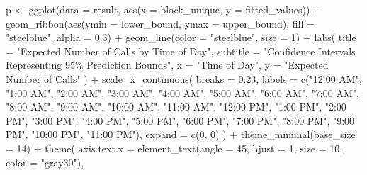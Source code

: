 \documentclass[
  letterpaper,
  DIV=11,
  numbers=noendperiod]{scrartcl}
\newenvironment{Shaded}{\begin{snugshade}}{\end{snugshade}}
\newcommand{\AttributeTok}[1]{\textcolor[rgb]{0.40,0.45,0.13}{#1}}
\newcommand{\DecValTok}[1]{\textcolor[rgb]{0.68,0.00,0.00}{#1}}
\newcommand{\FloatTok}[1]{\textcolor[rgb]{0.68,0.00,0.00}{#1}}
\newcommand{\FunctionTok}[1]{\textcolor[rgb]{0.28,0.35,0.67}{#1}}
\newcommand{\NormalTok}[1]{\textcolor[rgb]{0.00,0.23,0.31}{#1}}
\newcommand{\OtherTok}[1]{\textcolor[rgb]{0.00,0.23,0.31}{#1}}
\newcommand{\SpecialCharTok}[1]{\textcolor[rgb]{0.37,0.37,0.37}{#1}}
\newcommand{\StringTok}[1]{\textcolor[rgb]{0.13,0.47,0.30}{#1}}
\begin{document}
\begin{Shaded}
\begin{Highlighting}[]
\NormalTok{p }\OtherTok{\textless{}{-}} \FunctionTok{ggplot}\NormalTok{(}\AttributeTok{data =}\NormalTok{ result, }\FunctionTok{aes}\NormalTok{(}\AttributeTok{x =}\NormalTok{ block\_unique, }\AttributeTok{y =}\NormalTok{ fitted\_values)) }\SpecialCharTok{+}
  \FunctionTok{geom\_ribbon}\NormalTok{(}\FunctionTok{aes}\NormalTok{(}\AttributeTok{ymin =}\NormalTok{ lower\_bound, }\AttributeTok{ymax =}\NormalTok{ upper\_bound), }
              \AttributeTok{fill =} \StringTok{"steelblue"}\NormalTok{, }
              \AttributeTok{alpha =} \FloatTok{0.3}\NormalTok{) }\SpecialCharTok{+}
  \FunctionTok{geom\_line}\NormalTok{(}\AttributeTok{color =} \StringTok{"steelblue"}\NormalTok{, }\AttributeTok{size =} \DecValTok{1}\NormalTok{) }\SpecialCharTok{+} 
  \FunctionTok{labs}\NormalTok{(}
    \AttributeTok{title =} \StringTok{"Expected Number of Calls by Time of Day"}\NormalTok{,}
    \AttributeTok{subtitle =} \StringTok{"Confidence Intervals Representing 95\% Prediction Bounds"}\NormalTok{,}
    \AttributeTok{x =} \StringTok{"Time of Day"}\NormalTok{,}
    \AttributeTok{y =} \StringTok{"Expected Number of Calls"}
\NormalTok{  ) }\SpecialCharTok{+}
  \FunctionTok{scale\_x\_continuous}\NormalTok{(}
    \AttributeTok{breaks =} \DecValTok{0}\SpecialCharTok{:}\DecValTok{23}\NormalTok{, }
    \AttributeTok{labels =} \FunctionTok{c}\NormalTok{(}\StringTok{"12:00 AM"}\NormalTok{, }\StringTok{"1:00 AM"}\NormalTok{, }\StringTok{"2:00 AM"}\NormalTok{, }\StringTok{"3:00 AM"}\NormalTok{, }\StringTok{"4:00 AM"}\NormalTok{, }
               \StringTok{"5:00 AM"}\NormalTok{, }\StringTok{"6:00 AM"}\NormalTok{, }\StringTok{"7:00 AM"}\NormalTok{, }\StringTok{"8:00 AM"}\NormalTok{, }\StringTok{"9:00 AM"}\NormalTok{, }
               \StringTok{"10:00 AM"}\NormalTok{, }\StringTok{"11:00 AM"}\NormalTok{, }\StringTok{"12:00 PM"}\NormalTok{, }\StringTok{"1:00 PM"}\NormalTok{, }\StringTok{"2:00 PM"}\NormalTok{, }
               \StringTok{"3:00 PM"}\NormalTok{, }\StringTok{"4:00 PM"}\NormalTok{, }\StringTok{"5:00 PM"}\NormalTok{, }\StringTok{"6:00 PM"}\NormalTok{, }\StringTok{"7:00 PM"}\NormalTok{, }
               \StringTok{"8:00 PM"}\NormalTok{, }\StringTok{"9:00 PM"}\NormalTok{, }\StringTok{"10:00 PM"}\NormalTok{, }\StringTok{"11:00 PM"}\NormalTok{),}
    \AttributeTok{expand =} \FunctionTok{c}\NormalTok{(}\DecValTok{0}\NormalTok{, }\DecValTok{0}\NormalTok{)}
\NormalTok{  ) }\SpecialCharTok{+} 
  \FunctionTok{theme\_minimal}\NormalTok{(}\AttributeTok{base\_size =} \DecValTok{14}\NormalTok{) }\SpecialCharTok{+}
  \FunctionTok{theme}\NormalTok{(}
    \AttributeTok{axis.text.x =} \FunctionTok{element\_text}\NormalTok{(}\AttributeTok{angle =} \DecValTok{45}\NormalTok{, }\AttributeTok{hjust =} \DecValTok{1}\NormalTok{, }\AttributeTok{size =} \DecValTok{10}\NormalTok{, }\AttributeTok{color =} \StringTok{"gray30"}\NormalTok{),}

\end{Highlighting}
\end{Shaded}
\end{document}
